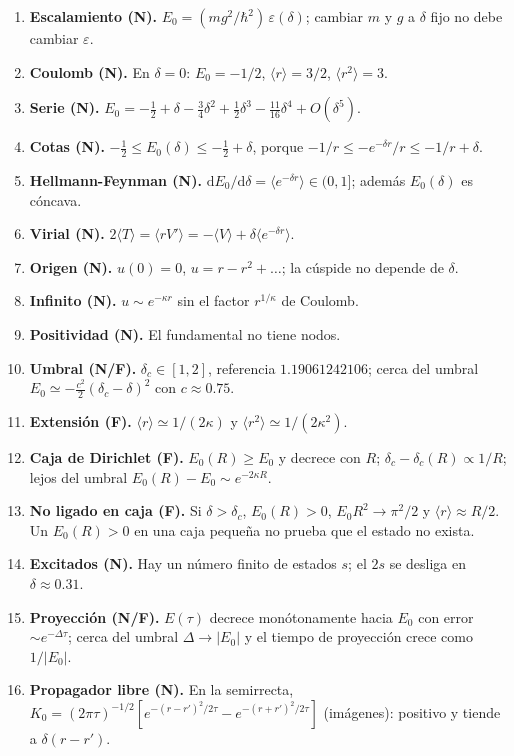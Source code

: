 \documentclass[11pt]{article}
\newcommand{\dd}{\mathrm{d}}
\newcommand{\dc}{\delta_c}
\begin{document}
\begin{enumerate}[label=\textbf{L\arabic*.},leftmargin=2.2em]
\item \textbf{Escalamiento (N).} $E_0=(mg^2/\hbar^2)\,\varepsilon(\delta)$; cambiar $m$ y $g$ a $\delta$ fijo no debe cambiar $\varepsilon$.
\item \textbf{Coulomb (N).} En $\delta=0$: $E_0=-1/2$, $\langle r\rangle=3/2$, $\langle r^2\rangle=3$.
\item \textbf{Serie (N).} $E_0=-\tfrac12+\delta-\tfrac34\delta^2+\tfrac12\delta^3-\tfrac{11}{16}\delta^4+O(\delta^5)$.
\item \textbf{Cotas (N).} $-\tfrac12\le E_0(\delta)\le-\tfrac12+\delta$, porque $-1/r\le-e^{-\delta r}/r\le-1/r+\delta$.
\item \textbf{Hellmann-Feynman (N).} $\dd E_0/\dd\delta=\langle e^{-\delta r}\rangle\in(0,1]$; además $E_0(\delta)$ es cóncava.
\item \textbf{Virial (N).} $2\langle T\rangle=\langle rV'\rangle=-\langle V\rangle+\delta\langle e^{-\delta r}\rangle$.
\item \textbf{Origen (N).} $u(0)=0$, $u=r-r^2+\dots$; la cúspide no depende de $\delta$.
\item \textbf{Infinito (N).} $u\sim e^{-\kappa r}$ sin el factor $r^{1/\kappa}$ de Coulomb.
\item \textbf{Positividad (N).} El fundamental no tiene nodos.
\item \textbf{Umbral (N/F).} $\dc\in[1,2]$, referencia $1.19061242106$; cerca del umbral $E_0\simeq-\tfrac{c^2}{2}(\dc-\delta)^2$ con $c\approx0.75$.
\item \textbf{Extensión (F).} $\langle r\rangle\simeq1/(2\kappa)$ y $\langle r^2\rangle\simeq1/(2\kappa^2)$.
\item \textbf{Caja de Dirichlet (F).} $E_0(R)\ge E_0$ y decrece con $R$; $\dc-\dc(R)\propto1/R$; lejos del umbral $E_0(R)-E_0\sim e^{-2\kappa R}$.
\item \textbf{No ligado en caja (F).} Si $\delta>\dc$, $E_0(R)>0$, $E_0R^2\to\pi^2/2$ y $\langle r\rangle\approx R/2$. Un $E_0(R)>0$ en una caja pequeña no prueba que el estado no exista.
\item \textbf{Excitados (N).} Hay un número finito de estados $s$; el $2s$ se desliga en $\delta\approx0.31$.
\item \textbf{Proyección (N/F).} $E(\tau)$ decrece monótonamente hacia $E_0$ con error $\sim e^{-\Delta\tau}$; cerca del umbral $\Delta\to|E_0|$ y el tiempo de proyección crece como $1/|E_0|$.
\item \textbf{Propagador libre (N).} En la semirrecta, $K_0=(2\pi\tau)^{-1/2}[e^{-(r-r')^2/2\tau}-e^{-(r+r')^2/2\tau}]$ (imágenes): positivo y tiende a $\delta(r-r')$.

\end{enumerate}
\end{document}
